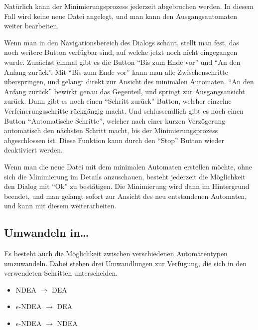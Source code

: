   Natürlich kann der Minimierungsprozess jederzeit abgebrochen werden. In diesem
  Fall wird keine neue Datei angelegt, und man kann den Ausgangsautomaten weiter
  bearbeiten. \vspace{10pt}
  
  Wenn man in den Navigationsbereich des Dialogs schaut, stellt man fest, das
  noch weitere Button verfügbar sind, auf welche jetzt noch nicht eingegangen
  wurde. Zunächst einmal gibt es die Button "`Bis zum Ende vor"' und "`An den
  Anfang zurück"'. Mit "`Bis zum Ende vor"' kann man alle Zwischenschritte
  überspringen, und gelangt direkt zur Ansicht des minimalen Automaten. "`An den
  Anfang zurück"' bewirkt genau das Gegenteil, und springt zur Ausgangsansicht
  zurück. Dann gibt es noch einen "`Schritt zurück"' Button, welcher einzelne
  Verfeinerungsschritte rückgängig macht. Und schlussendlich gibt es noch einen
  Button "`Automatische Schritte"', welcher nach einer kurzen Verzögerung
  automatisch den nächsten Schritt macht, bis der Minimierungsprozess
  abgeschlossen ist. Diese Funktion kann durch den "`Stop"' Button wieder
  deaktiviert werden.\vspace{10pt}
  
  Wenn man die neue Datei mit dem minimalen Automaten erstellen möchte, ohne sich
  die Minimierung im Details anzuschauen, besteht jederzeit die Möglich\-keit den
  Dialog mit "`Ok"' zu bestätigen. Die Minimierung wird dann im Hintergrund
  beendet, und man gelangt sofort zur Ansicht des neu entstandenen Automaten, und
  kann mit diesem weiterarbeiten.
  
  
\subsection{Umwandeln in\ldots}\label{ConvertTo}
  
Es besteht auch die Möglichkeit zwischen verschiedenen Automatentypen
umzuwandeln. Dabei stehen drei Umwandlungen zur Verfügung, die sich in den
verwendeten Schritten unterscheiden.

\begin{itemize}
  \item NDEA $\to$ DEA
  \item $\epsilon$-NDEA $\to$ DEA
  \item $\epsilon$-NDEA $\to$ NDEA
\end{itemize}

